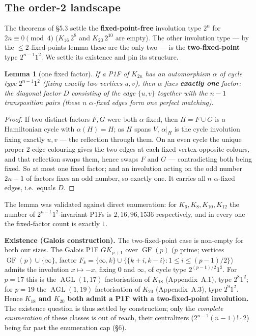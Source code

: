 \documentclass[11pt,reqno]{amsart}
\theoremstyle{plain}
\newtheorem{lemma}[theorem]{Lemma}
\theoremstyle{definition}
\numberwithin{theorem}{section}
\newcommand{\AGL}{\operatorname{AGL}}
\newcommand{\GF}{\operatorname{GF}}
\begin{document}
\subsection{The order-2 landscape}

The theorems of \S5.3 settle the \textbf{fixed-point-free} involution type $2^n$ for
$2n\equiv0\pmod4$ ($K_{16}\,2^8$ and $K_{20}\,2^{10}$ are empty). The other involution
type --- by the $\le 2$-fixed-points lemma these are the only two --- is the
\textbf{two-fixed-point} type $2^{n-1}1^2$. We settle its existence and pin its structure.

\begin{lemma}[one fixed factor]
If a P1F of $K_{2n}$ has an automorphism $\alpha$ of cycle
type $2^{n-1}1^2$ (fixing exactly two vertices $u,v$), then $\alpha$ fixes \textbf{exactly one}
factor: the \emph{diagonal factor} $D$ consisting of the edge $\{u,v\}$ together with the
$n-1$ transposition pairs (these $n$ $\alpha$-fixed edges form one perfect matching).
\end{lemma}

\begin{proof}
If two distinct factors $F,G$ were both $\alpha$-fixed, then $H=F\cup G$ is a
Hamiltonian cycle with $\alpha(H)=H$; as $H$ spans $V$, $\alpha|_H$ is the cycle
involution fixing exactly $u,v$ --- the reflection through them. On an even cycle the
unique proper $2$-edge-colouring gives the two edges at each fixed vertex opposite
colours, and that reflection swaps them, hence swaps $F$ and $G$ --- contradicting both
being fixed. So at most one fixed factor; and an involution acting on the odd number
$2n-1$ of factors fixes an odd number, so exactly one. It carries all $n$ $\alpha$-fixed
edges, i.e.\ equals $D$.
\end{proof}

The lemma was validated against direct enumeration: for $K_6,K_8,K_{10},K_{12}$ the
number of $2^{n-1}1^2$-invariant P1Fs is $2,16,96,1536$ respectively, and in every one
the fixed-factor count is exactly $1$.

\medskip
\noindent\textbf{Existence (Galois construction).} The two-fixed-point case is non-empty for both our
sizes. The Galois P1F $GK_{p+1}$ over $\GF(p)$ ($p$ prime; vertices
$\GF(p)\cup\{\infty\}$, factor $F_k=\{\infty,k\}\cup\{\{k+i,k-i\}:1\le i\le(p-1)/2\}$)
admits the involution $x\mapsto -x$, fixing $0$ and $\infty$, of cycle type
$2^{(p-1)/2}1^2$. For $p=17$ this is the $\AGL(1,17)$ factorisation of $K_{18}$
(Appendix~A.1), type $2^8 1^2$; for $p=19$ the $\AGL(1,19)$ factorisation of
$K_{20}$ (Appendix~A.3), type $2^9 1^2$. Hence \textbf{$K_{18}$ and $K_{20}$ both admit a P1F
with a two-fixed-point involution.} The existence question is thus settled by
construction; only the \emph{complete enumeration} of these classes is out of reach, their
centralizers ($2^{n-1}(n-1)!\cdot2$) being far past the enumeration cap (\S6).
\end{document}
